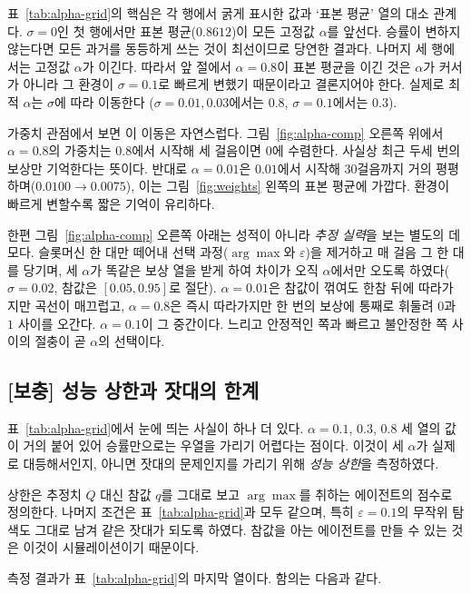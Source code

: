\documentclass[11pt,a4paper]{article}
\newcommand{\qt}{q}                       %
\newcommand{\Qe}{Q}                       %
\newcommand{\eps}{\varepsilon}
\begin{document}
표~\ref{tab:alpha-grid}의 핵심은 각 행에서 굵게 표시한 값과 `표본 평균' 열의 대소 관계다.
$\sigma=0$인 첫 행에서만 표본 평균($0.8612$)이 모든 고정값 $\alpha$를 앞선다. 승률이 변하지 않는다면
모든 과거를 동등하게 쓰는 것이 최선이므로 당연한 결과다. 나머지 세 행에서는 고정값 $\alpha$가 이긴다.
따라서 앞 절에서 $\alpha=0.8$이 표본 평균을 이긴 것은 $\alpha$가 커서가 아니라 그 환경이 $\sigma=0.1$로
빠르게 변했기 때문이라고 결론지어야 한다. 실제로 최적 $\alpha$는 $\sigma$에 따라 이동한다
($\sigma=0.01, 0.03$에서는 $0.8$, $\sigma=0.1$에서는 $0.3$).

가중치 관점에서 보면 이 이동은 자연스럽다. 그림~\ref{fig:alpha-comp} 오른쪽 위에서 $\alpha=0.8$의
가중치는 $0.8$에서 시작해 세 걸음이면 $0$에 수렴한다. 사실상 최근 두세 번의 보상만 기억한다는 뜻이다.
반대로 $\alpha=0.01$은 $0.01$에서 시작해 30걸음까지 거의 평평하며($0.0100 \to 0.0075$), 이는
그림~\ref{fig:weights} 왼쪽의 표본 평균에 가깝다. 환경이 빠르게 변할수록 짧은 기억이 유리하다.

한편 그림~\ref{fig:alpha-comp} 오른쪽 아래는 성적이 아니라 \emph{추정 실력}을 보는 별도의 데모다.
슬롯머신 한 대만 떼어내 선택 과정($\arg\max$와 $\eps$)을 제거하고 매 걸음 그 한 대를 당기며, 세 $\alpha$가
똑같은 보상 열을 받게 하여 차이가 오직 $\alpha$에서만 오도록 하였다($\sigma=0.02$, 참값은 $[0.05,0.95]$로
절단). $\alpha=0.01$은 참값이 꺾여도 한참 뒤에 따라가지만 곡선이 매끄럽고, $\alpha=0.8$은 즉시 따라가지만
한 번의 보상에 통째로 휘둘려 $0$과 $1$ 사이를 오간다. $\alpha=0.1$이 그 중간이다. 느리고 안정적인 쪽과
빠르고 불안정한 쪽 사이의 절충이 곧 $\alpha$의 선택이다.

\subsection{[보충] 성능 상한과 잣대의 한계}
\label{sec:ceiling}

표~\ref{tab:alpha-grid}에서 눈에 띄는 사실이 하나 더 있다. $\alpha=0.1$, $0.3$, $0.8$ 세 열의 값이
거의 붙어 있어 승률만으로는 우열을 가리기 어렵다는 점이다. 이것이 세 $\alpha$가 실제로 대등해서인지,
아니면 잣대의 문제인지를 가리기 위해 \emph{성능 상한}을 측정하였다.

상한은 추정치 $\Qe$ 대신 참값 $\qt$를 그대로 보고 $\arg\max$를 취하는 에이전트의 점수로 정의한다.
나머지 조건은 표~\ref{tab:alpha-grid}과 모두 같으며, 특히 $\eps=0.1$의 무작위 탐색도 그대로 남겨
같은 잣대가 되도록 하였다. 참값을 아는 에이전트를 만들 수 있는 것은 이것이 시뮬레이션이기 때문이다.

측정 결과가 표~\ref{tab:alpha-grid}의 마지막 열이다. 함의는 다음과 같다.
\end{document}
